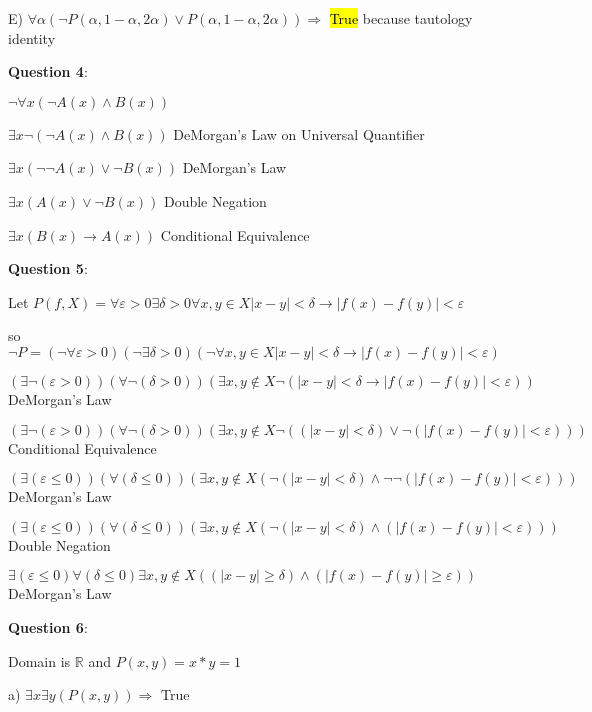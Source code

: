 \documentclass{article} %
\newcommand{\question}[2][]{\begin{flushleft}
        \textbf{Question #1}: \textit{#2}

\end{flushleft}}
\begin{document}
    E) $\forall \alpha (\neg P(\alpha, 1 - \alpha, 2 \alpha) \lor P(\alpha, 1-\alpha, 2\alpha)) \Rightarrow$ \hl{True} because tautology identity

    \question[4]{}

    $\neg \forall x (\neg A(x) \land B(x))$

    $\exists x \neg(\neg A(x) \land B(x))$ DeMorgan's Law on Universal Quantifier

    $\exists x (\neg \neg A(x) \lor \neg B(x))$ DeMorgan's Law

    $\exists x (A(x) \lor \neg B(x))$ Double Negation

    $\exists x (B(x) \rightarrow A(x))$ Conditional Equivalence

    \newpage

    \question[5]{}

    Let $P(f, X) = \forall \varepsilon > 0 \exists \delta > 0 \forall x, y \in X |x - y| < \delta \rightarrow |f(x) - f(y)| < \varepsilon$

    so $\neg P = (\neg \forall \varepsilon > 0) (\neg \exists \delta > 0) (\neg \forall x, y \in X |x - y| < \delta \rightarrow |f(x) - f(y)| < \varepsilon)$

    $(\exists \neg (\varepsilon > 0)) (\forall \neg (\delta > 0)) (\exists x, y \notin X \neg (|x - y| < \delta \rightarrow |f(x) - f(y)| < \varepsilon))$ DeMorgan's Law

    $(\exists \neg (\varepsilon > 0)) (\forall \neg (\delta > 0)) (\exists x, y \notin X \neg ((|x - y| < \delta) \lor \neg(|f(x) - f(y)| < \varepsilon)))$ Conditional Equivalence
    
    $(\exists (\varepsilon \leq 0)) (\forall  (\delta \leq 0)) (\exists x, y \notin X  (\neg (|x - y| < \delta) \land \neg \neg(|f(x) - f(y)| < \varepsilon)))$ DeMorgan's Law

    $(\exists (\varepsilon \leq 0)) (\forall  (\delta \leq 0)) (\exists x, y \notin X  (\neg (|x - y| < \delta) \land (|f(x) - f(y)| < \varepsilon)))$ Double Negation

    $\exists (\varepsilon \leq 0) \forall (\delta \leq 0) \exists x, y \notin X  ((|x - y| \geq \delta) \land (|f(x) - f(y)| \geq \varepsilon))$ DeMorgan's Law

    \question[6]{}

    Domain is $\mathbb{R}$ and $P(x, y) = x * y = 1$

    \hspace{0cm}

    a) $\exists x \exists y(P(x, y)) \Rightarrow$ True
\end{document}

